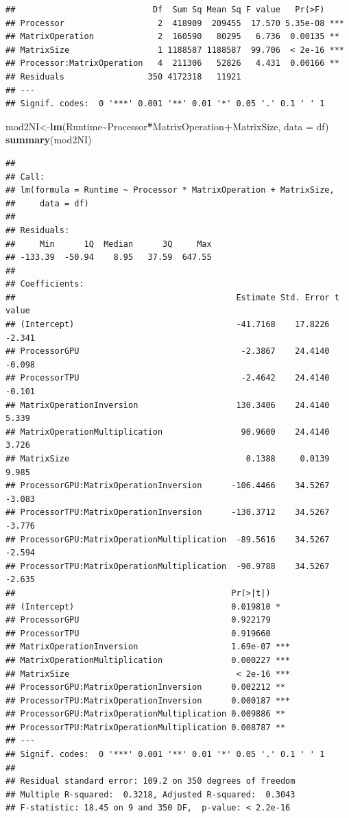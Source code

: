 \documentclass[
]{article}
\newenvironment{Shaded}{\begin{snugshade}}{\end{snugshade}}
\newcommand{\DataTypeTok}[1]{\textcolor[rgb]{0.13,0.29,0.53}{#1}}
\newcommand{\KeywordTok}[1]{\textcolor[rgb]{0.13,0.29,0.53}{\textbf{#1}}}
\newcommand{\NormalTok}[1]{#1}
\newcommand{\OperatorTok}[1]{\textcolor[rgb]{0.81,0.36,0.00}{\textbf{#1}}}
\begin{document}
\begin{verbatim}
##                            Df  Sum Sq Mean Sq F value   Pr(>F)    
## Processor                   2  418909  209455  17.570 5.35e-08 ***
## MatrixOperation             2  160590   80295   6.736  0.00135 ** 
## MatrixSize                  1 1188587 1188587  99.706  < 2e-16 ***
## Processor:MatrixOperation   4  211306   52826   4.431  0.00166 ** 
## Residuals                 350 4172318   11921                     
## ---
## Signif. codes:  0 '***' 0.001 '**' 0.01 '*' 0.05 '.' 0.1 ' ' 1
\end{verbatim}

\begin{Shaded}
\begin{Highlighting}[]
\NormalTok{mod2NI\textless{}{-}}\KeywordTok{lm}\NormalTok{(Runtime}\OperatorTok{\textasciitilde{}}\NormalTok{Processor}\OperatorTok{*}\NormalTok{MatrixOperation}\OperatorTok{+}\NormalTok{MatrixSize, }\DataTypeTok{data =}\NormalTok{ df)}
\KeywordTok{summary}\NormalTok{(mod2NI)}
\end{Highlighting}
\end{Shaded}

\begin{verbatim}
## 
## Call:
## lm(formula = Runtime ~ Processor * MatrixOperation + MatrixSize, 
##     data = df)
## 
## Residuals:
##     Min      1Q  Median      3Q     Max 
## -133.39  -50.94    8.95   37.59  647.55 
## 
## Coefficients:
##                                             Estimate Std. Error t value
## (Intercept)                                 -41.7168    17.8226  -2.341
## ProcessorGPU                                 -2.3867    24.4140  -0.098
## ProcessorTPU                                 -2.4642    24.4140  -0.101
## MatrixOperationInversion                    130.3406    24.4140   5.339
## MatrixOperationMultiplication                90.9600    24.4140   3.726
## MatrixSize                                    0.1388     0.0139   9.985
## ProcessorGPU:MatrixOperationInversion      -106.4466    34.5267  -3.083
## ProcessorTPU:MatrixOperationInversion      -130.3712    34.5267  -3.776
## ProcessorGPU:MatrixOperationMultiplication  -89.5616    34.5267  -2.594
## ProcessorTPU:MatrixOperationMultiplication  -90.9788    34.5267  -2.635
##                                            Pr(>|t|)    
## (Intercept)                                0.019810 *  
## ProcessorGPU                               0.922179    
## ProcessorTPU                               0.919660    
## MatrixOperationInversion                   1.69e-07 ***
## MatrixOperationMultiplication              0.000227 ***
## MatrixSize                                  < 2e-16 ***
## ProcessorGPU:MatrixOperationInversion      0.002212 ** 
## ProcessorTPU:MatrixOperationInversion      0.000187 ***
## ProcessorGPU:MatrixOperationMultiplication 0.009886 ** 
## ProcessorTPU:MatrixOperationMultiplication 0.008787 ** 
## ---
## Signif. codes:  0 '***' 0.001 '**' 0.01 '*' 0.05 '.' 0.1 ' ' 1
## 
## Residual standard error: 109.2 on 350 degrees of freedom
## Multiple R-squared:  0.3218, Adjusted R-squared:  0.3043 
## F-statistic: 18.45 on 9 and 350 DF,  p-value: < 2.2e-16
\end{verbatim}
\end{document}
